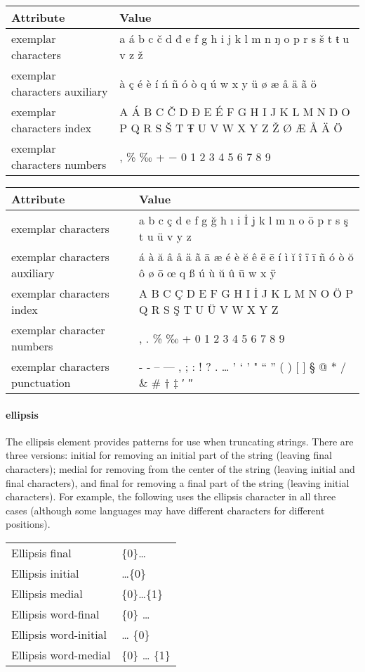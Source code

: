 \begin{longtable}{l p{8cm}}
\toprule
Attribute             & Value \\
\midrule
exemplar characters   & a á b c č d đ e f g h i j k l m n ŋ o p r s š t ŧ u v z ž\\
exemplar characters auxiliary  & à ç é è í ń ñ ó ò q ú w x y ü ø æ å ä ã ö\\
exemplar characters index  &A Á B C Č D Đ E É F G H I J K L M N Ŋ O P Q R S Š T Ŧ U V W X Y Z Ž Ø Æ Å Ä Ö\\
exemplar characters numbers &  , \% ‰ + − 0 1 2 3 4 5 6 7 8 9\\
\bottomrule
\end{longtable}


\begin{longtable}{l p{8cm}}
\toprule
Attribute             & Value \\
\midrule
 exemplar characters &a b c ç d e f g ğ h ı i İ j k l m n o ö p r s ş t u ü v y z\\
exemplar characters  auxiliary & á à ă â å ä ã ā æ é è ĕ ê ë ē í ì ĭ î ï ī ñ ó ò ŏ ô ø ō œ q ß ú ù ŭ û ū w x ÿ\\
 exemplar characters index & A B C Ç D E F G H I İ J K L M N O Ö P Q R S Ş T U Ü V W X Y Z\\
exemplar character numbers & \- , . \% ‰ + 0 1 2 3 4 5 6 7 8 9\\
exemplar characters punctuation &  - ‐ – — , ; : ! ? . … ' ‘ ’ " “ ” ( ) [ ] § @ * / \& \# † ‡ ′ ″\\
\bottomrule
\end{longtable}


\paragraph{ellipsis}The ellipsis element provides patterns for use when truncating strings. There are three versions: initial for removing an initial part of the string (leaving final characters); medial for removing from the center of the string (leaving initial and final characters), and final for removing a final part of the string (leaving initial characters). For example, the following uses the ellipsis character in all three cases (although some languages may have different characters for different positions).

\begin{longtable}{ll}
Ellipsis final & \{0\}… \\           
Ellipsis initial & …\{0\} \\         
Ellipsis medial  & \{0\}…\{1\} \\       
Ellipsis word-final & \{0\} … \\     
Ellipsis word-initial & … \{0\} \\   
Ellipsis word-medial & \{0\} … \{1\}\\
\end{longtable} 

